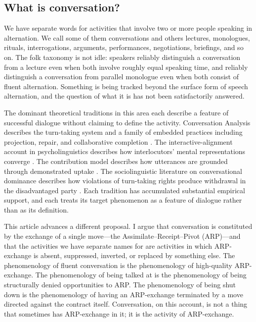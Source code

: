 \subsection{What is conversation?}

We have separate words for activities that involve two or more people speaking in alternation. We call some of them conversations and others lectures, monologues, rituals, interrogations, arguments, performances, negotiations, briefings, and so on. The folk taxonomy is not idle: speakers reliably distinguish a conversation from a lecture even when both involve roughly equal speaking time, and reliably distinguish a conversation from parallel monologue even when both consist of fluent alternation. Something is being tracked beyond the surface form of speech alternation, and the question of what it is has not been satisfactorily answered.

The dominant theoretical traditions in this area each describe a feature of successful dialogue without claiming to define the activity. Conversation Analysis describes the turn-taking system \citep{Sacks1974} and a family of embedded practices including projection, repair, and collaborative completion \citep{Lerner1991,Hayashi2003}. The interactive-alignment account in psycholinguistics describes how interlocutors' mental representations converge \citep{PickeringGarrod2004,PickeringGarrod2013}. The contribution model describes how utterances are grounded through demonstrated uptake \citep{ClarkSchaefer1989,ClarkBrennan1991}. The sociolinguistic literature on conversational dominance describes how violations of turn-taking rights produce withdrawal in the disadvantaged party \citep{ZimmermanWest1975,WestZimmerman1983,Itakura2001}. Each tradition has accumulated substantial empirical support, and each treats its target phenomenon as a feature of dialogue rather than as its definition.

This article advances a different proposal. I argue that conversation is constituted by the exchange of a single move---the Assimilate--Receipt--Pivot (ARP)---and that the activities we have separate names for are activities in which ARP-exchange is absent, suppressed, inverted, or replaced by something else. The phenomenology of fluent conversation is the phenomenology of high-quality ARP-exchange. The phenomenology of being talked at is the phenomenology of being structurally denied opportunities to ARP. The phenomenology of being shut down is the phenomenology of having an ARP-exchange terminated by a move directed against the contract itself. Conversation, on this account, is not a thing that sometimes has ARP-exchange in it; it is the activity of ARP-exchange.


